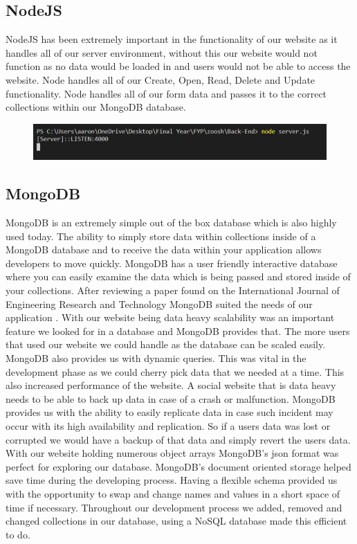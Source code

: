 \subsection{NodeJS}
NodeJS has been extremely important in the functionality of our website as it handles all of our server environment, without this our website would not function as no data would be loaded in and users would not be able to access the website. Node handles all of our Create, Open, Read, Delete and Update functionality. Node handles all of our form data and passes it to the correct collections within our MongoDB database.

\begin{figure}[H]
  \centering
  \includegraphics[scale=0.55]{img/server.PNG}
  \label{fig:NodeJS Server running.}
\end{figure}

\subsection{MongoDB}
MongoDB is an extremely simple out of the box database which is also highly used today. The ability to simply store data within collections inside of a MongoDB database and to receive the data within your application allows developers to move quickly. MongoDB has a user friendly interactive database where you can easily examine the data which is being passed and stored inside of your collections.
After reviewing a paper found on the International Journal of Engineering Research and Technology MongoDB suited the needs of our application \cite{chauhan2019review}. With our website being data heavy scalability was an important feature we looked for in a database and MongoDB provides that. The more users that used our website we could handle as the database can be scaled easily. MongoDB also provides us with dynamic queries. This was vital in the development phase as we could cherry pick data that we needed at a time. This also increased performance of the website. A social website that is data heavy needs to be able to back up data in case of a crash or malfunction. MongoDB provides us with the ability to easily replicate data in case such incident may occur with its high availability and replication. So if a users data was lost or corrupted we would have a backup of that data and simply revert the users data.
With our website holding numerous object arrays MongoDB's json format was perfect for exploring our database. MongoDB's document oriented storage helped save time during the developing process.\cite{MongoDB}
Having a flexible schema provided us with the opportunity to swap and change names and values in a short space of time if necessary. Throughout our development process we added, removed and changed collections in our database, using a NoSQL database made this efficient to do.

